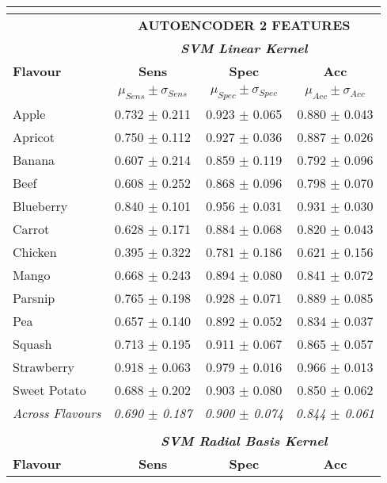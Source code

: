 \documentclass[authoryear]{elsarticle}
\begin{document}
\begin{tabular}{lccc}
    \multicolumn{4}{c}{}\\  
    \toprule
          & \multicolumn{3}{c}{\textbf{AUTOENCODER 2 FEATURES}} \\
          & \multicolumn{3}{c}{\textit{\textbf{SVM Linear Kernel}}}\\
    \midrule
    \textbf{Flavour} & \textbf{Sens} & \textbf{Spec} & \textbf{Acc}\\
    & $\mu_{Sens} \pm \sigma_{Sens}$ & $\mu_{Spec} \pm \sigma_{Spec}$ & $\mu_{Acc} \pm \sigma_{Acc}$ \\
    \midrule
    Apple 		 & 0.732 $\pm$ 0.211 & 0.923 $\pm$ 0.065 & 0.880 $\pm$ 0.043 \\
    Apricot 	 & 0.750 $\pm$ 0.112 & 0.927 $\pm$ 0.036 & 0.887 $\pm$ 0.026 \\
    Banana 		 & 0.607 $\pm$ 0.214 & 0.859 $\pm$ 0.119 & 0.792 $\pm$ 0.096 \\
    Beef 		 & 0.608 $\pm$ 0.252 & 0.868 $\pm$ 0.096 & 0.798 $\pm$ 0.070 \\
    Blueberry  	 & 0.840 $\pm$ 0.101 & 0.956 $\pm$ 0.031 & 0.931 $\pm$ 0.030 \\
    Carrot 		 & 0.628 $\pm$ 0.171 & 0.884 $\pm$ 0.068 & 0.820 $\pm$ 0.043 \\
    Chicken  	 & 0.395 $\pm$ 0.322 & 0.781 $\pm$ 0.186 & 0.621 $\pm$ 0.156 \\
    Mango 		 & 0.668 $\pm$ 0.243 & 0.894 $\pm$ 0.080 & 0.841 $\pm$ 0.072 \\
    Parsnip 	 & 0.765 $\pm$ 0.198 & 0.928 $\pm$ 0.071 & 0.889 $\pm$ 0.085 \\
    Pea 		 & 0.657 $\pm$ 0.140 & 0.892 $\pm$ 0.052 & 0.834 $\pm$ 0.037 \\
    Squash 		 & 0.713 $\pm$ 0.195 & 0.911 $\pm$ 0.067 & 0.865 $\pm$ 0.057 \\
    Strawberry 	 & 0.918 $\pm$ 0.063 & 0.979 $\pm$ 0.016 & 0.966 $\pm$ 0.013 \\
    Sweet Potato & 0.688 $\pm$ 0.202 & 0.903 $\pm$ 0.080 & 0.850 $\pm$ 0.062 \\
    \midrule
    \textit{Across Flavours} & \textit{0.690 $\pm$ 0.187} & \textit{0.900 $\pm$ 0.074} & \textit{0.844 $\pm$ 0.061} \\
    \midrule
    \multicolumn{4}{c}{}\\    
    \midrule
    & \multicolumn{3}{c}{\textit{\textbf{SVM Radial Basis Kernel}}}\\
    \midrule
    \textbf{Flavour} & \textbf{Sens} & \textbf{Spec} & \textbf{Acc}\\

\end{tabular}
\end{document}
